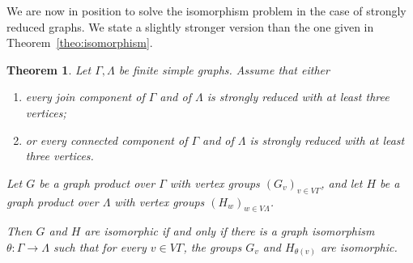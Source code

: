 \documentclass[a4paper,english,11pt]{article}
\newtheorem{theo}[de]{Theorem}
\theoremstyle{definition}
\theoremstyle{remark}
\begin{document}
We are now in position to solve the isomorphism problem in the case of strongly reduced graphs. We state a slightly stronger version than the one given in %
Theorem~\ref{theo:isomorphism}.

\begin{theo}\label{theo:iso-strongly-reduced}
Let $\Gamma,\Lambda$ be finite simple graphs. Assume that either 
\begin{enumerate}
\item\label{item:assumption1} every join component of $\Gamma$ and of $\Lambda$ is strongly reduced with at least three vertices;
\item\label{item:assumption2} or every connected component of $\Gamma$ and of $\Lambda$ is strongly reduced with at least three vertices.
\end{enumerate}
Let $G$ be a graph product over $\Gamma$ with vertex groups $(G_v)_{v\in V\Gamma}$, and let $H$ be a graph product over $\Lambda$ with vertex groups $(H_w)_{w\in V\Lambda}$. 

Then $G$ and $H$ are isomorphic if and only if there is a graph isomorphism $\theta:\Gamma\to\Lambda$ such that for every $v\in V\Gamma$, the groups $G_v$ and $H_{\theta(v)}$ are isomorphic.
\end{theo}
\end{document}
